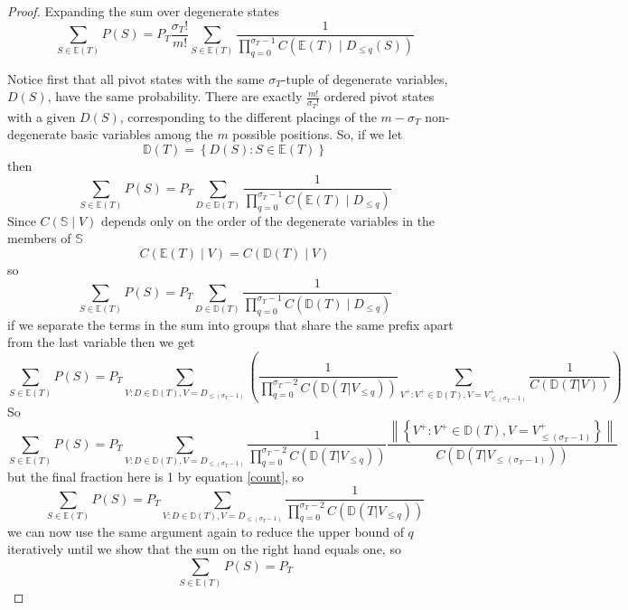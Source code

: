 \documentclass{article}
\begin{document}
\begin{proof}
	Expanding the sum over degenerate states
	\[
	\sum_{S \in \mathbb{E}(T)} P(S) =
	P_T \frac{\sigma_T!}{m!} \sum_{S \in \mathbb{E}(T)} \frac{1}{\prod_{q=0}^{\sigma_T-1} C(\mathbb{E}(T) \mid D_{\le q}(S))}
	\]
	
	Notice first that all pivot states with the same $\sigma_T$-tuple of degenerate variables, $D(S)$, have the same probability. There are exactly $\frac{m!}{\sigma_T!}$ ordered pivot states with a given $D(S)$, corresponding to the different placings of the $m-\sigma_T$ non-degenerate basic variables among the $m$ possible positions. So, if we let
	\[
	\mathbb{D}(T) = \left\{ D(S) : S \in \mathbb{E}(T) \right\}
	\]
	then
	\[
	\sum_{S \in \mathbb{E}(T)} P(S) = P_T \sum_{D \in \mathbb{D}(T)} \frac{1}{\prod_{q=0}^{\sigma_T-1} C(\mathbb{E}(T) \mid D_{\le q})}
	\]
	Since $C(\mathbb{S} \mid V)$ depends only on the order of the degenerate variables in the members of $\mathbb{S}$
	\[
	C(\mathbb{E}(T) \mid V) = C(\mathbb{D}(T) \mid V)
	\]
	so
	\begin{equation}
	\sum_{S \in \mathbb{E}(T)} P(S) = P_T \sum_{D \in \mathbb{D}(T)} \frac{1}{\prod_{q=0}^{\sigma_T-1} C(\mathbb{D}(T) \mid D_{\le q})}
	\label{normalForm}
	\end{equation}
	if we separate the terms in the sum into groups that share the same prefix apart from the last variable then we get
	\[
	\sum_{S \in \mathbb{E}(T)} P(S) = 
	P_T \sum_{V : D \in \mathbb{D}(T), V = D_{\le (\sigma_T-1)}} 
	\left(
	\frac{1}{\prod_{q=0}^{\sigma_T-2} C(\mathbb{D}(T|V_{\le q}))}
	\sum_{V^+: V^+ \in \mathbb{D}(T), V = V^+_{\le (\sigma_T-1)}}
	\frac{1}{C(\mathbb{D}(T|V))}
	\right)
	\]
	So
	\[
	\sum_{S \in \mathbb{E}(T)} P(S) = 
	P_T \sum_{V : D \in \mathbb{D}(T), V = D_{\le (\sigma_T-1)}} 
	\frac{1}{\prod_{q=0}^{\sigma_T-2} C(\mathbb{D}(T|V_{\le q}))}
	\frac{\left\|\left\{V^+: V^+ \in \mathbb{D}(T), V = V^+_{\le (\sigma_T-1)}\right\}\right\|}{C(\mathbb{D}(T|V_{\le (\sigma_T-1)}))}
	\]
	but the final fraction here is 1 by equation \ref{count}, so
	\[
	\sum_{S \in \mathbb{E}(T)} P(S) = 
	P_T \sum_{V : D \in \mathbb{D}(T), V = D_{\le (\sigma_T-1)}} 
	\frac{1}{\prod_{q=0}^{\sigma_T-2} C(\mathbb{D}(T|V_{\le q}))}
	\]
	we can now use the same argument again to reduce the upper bound of $q$ iteratively until we show that the sum on the right hand equals one, so
	\[
	\sum_{S \in \mathbb{E}(T)} P(S) = P_T
	\]
\end{proof}
\end{document}
